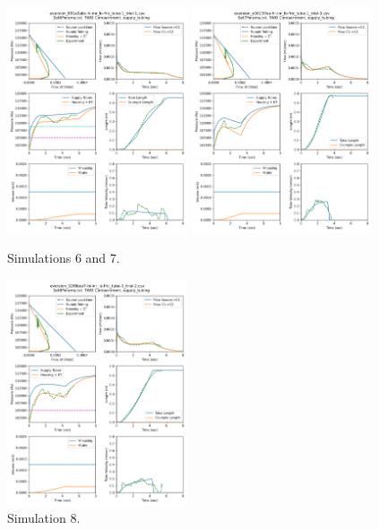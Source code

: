 \documentclass[letterpaper]{article}
\begin{document}
\begin{figure}\centering
\includegraphics[width=0.475\textwidth]{9Files_Sim_outputs/Set6redo-26-Aug.png}
\includegraphics[width=0.475\textwidth]{9Files_Sim_outputs/Set7redo-26-Aug.png}
\caption{Simulations 6 and 7.}
\end{figure}



\begin{figure}\centering
\includegraphics[width=0.475\textwidth]{9Files_Sim_outputs/Set8redo-26-Aug.png}
\caption{Simulation 8.}
\end{figure}
\end{document}
